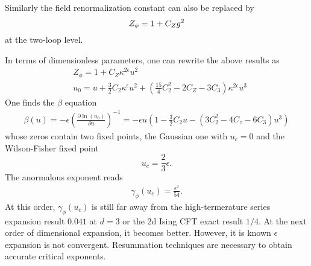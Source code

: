 \documentclass[submission, PhysLectNotes]{SciPost}
\begin{document}
Similarly the field renormalization constant can also be replaced by
\begin{equation}
	Z_\phi = 1 + C_Z g^2 \\
\end{equation}
at the two-loop level.

In terms of dimensionless parameters, one can rewrite the above results as
\begin{equation}
	\begin{aligned}
		&Z_\phi = 1 + C_Z \kappa^{2 \epsilon} u^2 \\
		&u_0 = u + \frac{3}{2} C_2 \kappa^{\epsilon} u^2 + \left(\frac{15}{4} C_2^2 - 2 C_Z - 3 C_3\right) \kappa^{2\epsilon} u^3
	\end{aligned}
\end{equation}
One finds the $\beta$ equation
\begin{equation}
	\begin{aligned}
		\beta(u) = -\epsilon\left(\frac{\partial \ln(u_0)}{\partial u}\right)^{-1} = -\epsilon u \left( 1 - \frac{3}{2} C_2 u - \left(3C_2^2-4C_z-6C_3\right)u^3 \right)
	\end{aligned}
\end{equation}
whose zeros contain two fixed points, the Gaussian one with $u_c = 0$ and the Wilson-Fisher fixed point
\begin{equation}
	u_c = \frac{2}{3}\epsilon.
\end{equation}
The anormalous exponent reads 
\begin{equation}
	\begin{aligned}
		\gamma_\phi(u_c) = \frac{\epsilon^2}{54}. 
	\end{aligned}
\end{equation}
At this order, $\gamma_\phi(u_c)$ is still far away from the high-termerature series expansion result $0.041$ at $d=3$ or the 2d Ising CFT exact result $1/4$. At the next order of dimensional expansion, it becomes better. However, it is known $\epsilon$ expansion is not convergent. Resummation techniques are necessary to obtain accurate critical exponents.
\end{document}

